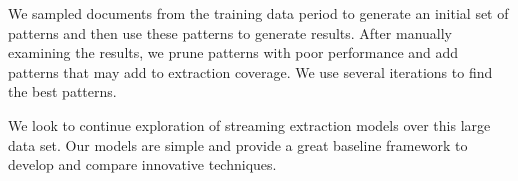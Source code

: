 We sampled documents from the training data period to generate an initial set of patterns and then use these patterns to generate results.
After manually examining the results, we prune patterns with poor performance and add patterns that may add to extraction coverage.
We use several iterations to find the best patterns.



We look to continue exploration of streaming extraction models over this large data set.
Our models are simple and provide a great baseline framework to develop and compare innovative techniques.


